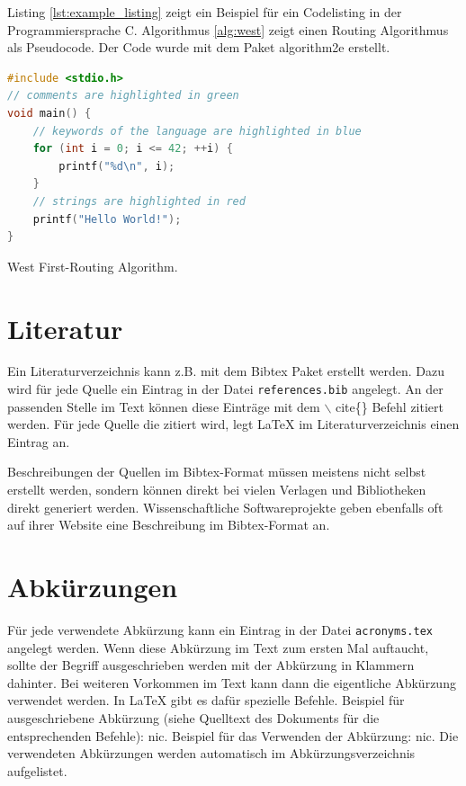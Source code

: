 Listing \ref{lst:example_listing} zeigt ein Beispiel für ein Codelisting in der Programmiersprache C. Algorithmus \ref{alg:west} zeigt einen Routing Algorithmus als Pseudocode. Der Code wurde mit dem Paket algorithm2e \cite{algorithm2e} erstellt.

\begin{lstlisting}[language=C, caption=Beispiel für ein Codelisting in der Sprache C., label=lst:example_listing]
#include <stdio.h>
// comments are highlighted in green
void main() {
    // keywords of the language are highlighted in blue
    for (int i = 0; i <= 42; ++i) {
        printf("%d\n", i);
    }
    // strings are highlighted in red
    printf("Hello World!");
}
\end{lstlisting}

\begin{algorithm}[ht]

 \caption{West First-Routing Algorithm.}
 \label{alg:west}
\end{algorithm}

\section{Literatur}
Ein Literaturverzeichnis kann z.B. mit dem Bibtex Paket \cite{bibtex} erstellt werden. Dazu wird für jede Quelle ein Eintrag in der Datei \texttt{references.bib} angelegt. An der passenden Stelle im Text können diese Einträge mit dem \ensuremath{\backslash} cite\{\} Befehl zitiert werden. Für jede Quelle die zitiert wird, legt \LaTeX{}  im Literaturverzeichnis einen Eintrag an.

Beschreibungen der Quellen im Bibtex-Format müssen meistens nicht selbst erstellt werden, sondern können direkt bei vielen Verlagen und Bibliotheken direkt generiert werden. Wissenschaftliche Softwareprojekte geben ebenfalls oft auf ihrer Website eine Beschreibung im Bibtex-Format an.



\section{Abkürzungen}
Für jede verwendete Abkürzung kann ein Eintrag in der Datei \texttt{acronyms.tex} angelegt werden. Wenn diese Abkürzung im Text zum ersten Mal auftaucht, sollte der Begriff ausgeschrieben werden mit der Abkürzung in Klammern dahinter. Bei weiteren Vorkommen im Text kann dann die eigentliche Abkürzung verwendet werden. In \LaTeX{} gibt es dafür spezielle Befehle. Beispiel für ausgeschriebene Abkürzung (siehe Quelltext des Dokuments für die entsprechenden Befehle): \acrfull{nic}. Beispiel für das Verwenden der Abkürzung: \acrshort{nic}. Die verwendeten Abkürzungen werden automatisch im Abkürzungsverzeichnis aufgelistet.
